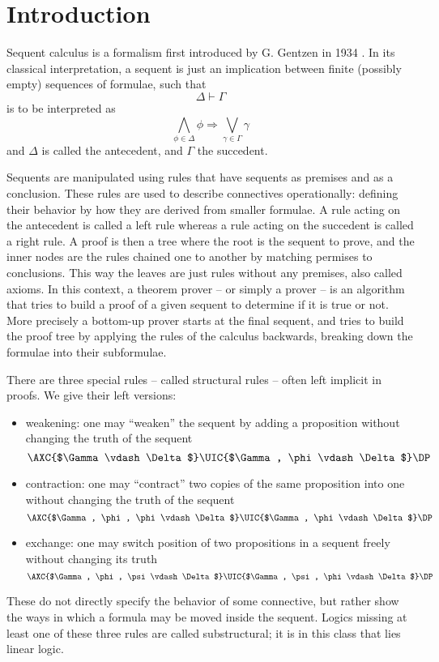 \chapter{Introduction}\label{chapter:intro}
Sequent calculus is a formalism first introduced by G. Gentzen in 1934 \cite{Gentzen1935I, Gentzen1935II}.
In its classical interpretation, a sequent is just an implication between finite (possibly empty) sequences of formulae, such that
$$ \Delta \vdash \Gamma $$ 
is to be interpreted as
$$ \bigwedge_{\phi \in \Delta} \phi \Rightarrow \bigvee_{\gamma \in \Gamma} \gamma $$
and $\Delta$ is called the antecedent, and $\Gamma$ the succedent.

Sequents are manipulated using rules that have sequents as premises and as a conclusion.
These rules are used to describe connectives operationally: defining their behavior by how they are derived from smaller formulae.
A rule acting on the antecedent is called a left rule whereas a rule acting on the succedent is called a right rule.
A proof is then a tree where the root is the sequent to prove, and the inner nodes are the rules chained one to another by matching permises to conclusions.
This way the leaves are just rules without any premises, also called axioms.
In this context, a theorem prover -- or simply a prover -- is an algorithm that tries to build a proof of a given sequent to determine if it is true or not.
More precisely a bottom-up prover starts at the final sequent, and tries to build the proof tree by applying the rules of the calculus backwards, breaking down the formulae into their subformulae.

There are three special rules -- called structural rules -- often left implicit in proofs.
We give their left versions:
\begin{itemize}
	\item weakening: one may ``weaken'' the sequent by adding a proposition without changing the truth of the sequent
		$$
		\AXC{$\Gamma \vdash \Delta$}
		\UIC{$\Gamma, \phi \vdash \Delta$}
		\DP
		$$
	\item contraction: one may ``contract'' two copies of the same proposition into one without changing the truth of the sequent
		$$
		\AXC{$\Gamma, \phi, \phi \vdash \Delta$}
		\UIC{$\Gamma, \phi \vdash \Delta$}
		\DP
		$$
	\item exchange: one may switch position of two propositions in a sequent freely without changing its truth
		$$
		\AXC{$\Gamma, \phi, \psi \vdash \Delta$}
		\UIC{$\Gamma, \psi, \phi \vdash \Delta$}
		\DP
		$$
\end{itemize}
These do not directly specify the behavior of some connective, but rather show the ways in which a formula may be moved inside the sequent.
Logics missing at least one of these three rules are called substructural; it is in this class that lies linear logic.

